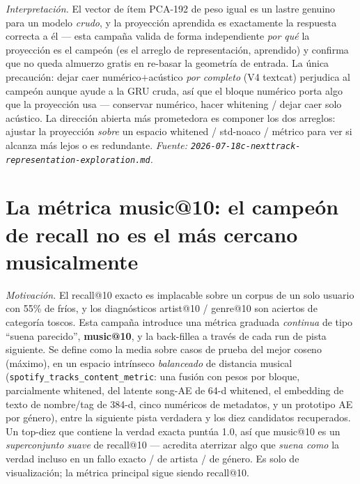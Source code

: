 \documentclass[11pt]{article}
\newcommand{\dsid}[1]{\texttt{\small #1}}
\begin{document}
\emph{Interpretación.} El vector de ítem PCA-192 de peso igual es un lastre genuino
para un modelo \emph{crudo}, y la proyección aprendida es exactamente la respuesta
correcta a él --- esta campaña valida de forma independiente \emph{por qué} la
proyección es el campeón (es el arreglo de representación, aprendido) y confirma que
no queda almuerzo gratis en re-basar la geometría de entrada. La única precaución:
dejar caer numérico$+$acústico \emph{por completo} (V4 textcat) perjudica al campeón
aunque ayude a la GRU cruda, así que el bloque numérico porta algo que la proyección
usa --- conservar numérico, hacer whitening / dejar caer solo acústico. La dirección
abierta más prometedora es componer los dos arreglos: ajustar la proyección
\emph{sobre} un espacio whitened / std-noaco / métrico para ver si alcanza más lejos
o es redundante.
\emph{Fuente: \texttt{2026-07-18c-nexttrack-representation-exploration.md}.}

\section{La métrica music@10: el campeón de recall no es el más cercano musicalmente}
\label{sec:music}
\emph{Motivación.} El recall@10 exacto es implacable sobre un corpus de un solo
usuario con 55\% de fríos, y los diagnósticos artist@10 / genre@10 son aciertos de
categoría toscos. Esta campaña introduce una métrica graduada \emph{continua} de tipo
``suena parecido'', \textbf{music@10}, y la back-fillea a través de cada run de pista
siguiente. Se define como la media sobre casos de prueba del mejor coseno (máximo),
en un espacio intrínseco \emph{balanceado} de distancia musical
(\dsid{spotify\_tracks\_content\_metric}: una fusión con pesos por bloque,
parcialmente whitened, del latente song-AE de 64-d whitened, el embedding de texto de
nombre/tag de 384-d, cinco numéricos de metadatos, y un prototipo AE por género),
entre la siguiente pista verdadera y los diez candidatos recuperados. Un top-diez que
contiene la verdad exacta puntúa \num{1.0}, así que music@10 es un \emph{superconjunto
suave} de recall@10 --- acredita aterrizar algo que \emph{suena como} la verdad
incluso en un fallo exacto / de artista / de género. Es solo de visualización; la
métrica principal sigue siendo recall@10.
\end{document}
